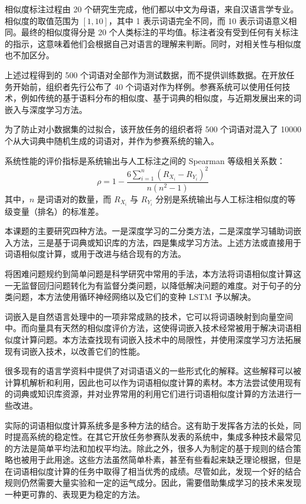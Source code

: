 相似度标注过程由 20 个研究生完成，他们都以中文为母语，来自汉语言学专业。相似度的取值范围为 $[1, 10]$，其中 1 表示词语完全不同，而 10 表示词语意义相同。最终的相似度得分是 20 个人类标注的平均值。标注者没有受到任何有关标注的指示，这意味着他们会根据自己对语言的理解来判断。同时，对相关性与相似度也不加区分。

上述过程得到的 500 个词语对全部作为测试数据，而不提供训练数据。在开放任务开始前，组织者先行公布了 40 个词语对作为样例。参赛系统可以使用任何技术，例如传统的基于语料分布的相似度、基于词典的相似度，与近期发展出来的词嵌入与深度学习方法。

为了防止对小数据集的过拟合，该开放任务的组织者将 500 个词语对混入了 10000 个从大词典中随机生成的词语对，并作为参赛系统的输入。

系统性能的评价指标是系统输出与人工标注之间的 Spearman 等级相关系数：
\begin{equation}
\rho = 1 - \frac{6 \sum_{i = 1}^{n}(R_{X_i} - R_{Y_i})^2}{n(n^2 - 1)}
\end{equation}
其中，$n$ 是词语对的数量，而 $R_{X_i}$ 与 $R_{Y_i}$ 分别是系统输出与人工标注相似度的等级变量（排名）的标准差。


本课题的主要研究四种方法。一是深度学习的二分类方法，二是深度学习辅助词嵌入方法，三是基于词典或知识库的方法，四是集成学习方法。上述方法或直接用于词语相似度计算，或用于改进与结合现有的方法。

将困难问题规约到简单问题是科学研究中常用的手法，本方法将词语相似度计算这一无监督回归问题转化为有监督分类问题，以降低解决问题的难度。对于句子的分类问题，本方法使用循环神经网络以及它们的变种 LSTM 予以解决。

词嵌入是自然语言处理中的一项非常成熟的技术，它可以将词语映射到向量空间中。而向量具有天然的相似度评价方法，这使得词嵌入技术经常被用于解决词语相似度计算问题。本方法查找现有词嵌入技术中的局限性，并使用深度学习方法拓展现有词嵌入技术，以改善它们的性能。

很多现有的语言学资料中提供了对词语语义的一些形式化的解释。这些解释可以被计算机解析和利用，因此也可以作为词语相似度计算的素材。本方法尝试使用现有的词典或知识库资源，并对业界常用的利用它们进行词语相似度计算的方法进行一些改进。

实际的词语相似度计算系统多是多种方法的结合。这有助于发挥各方法的长处，同时提高系统的稳定性。在其它开放任务参赛队发表的系统中，集成多种技术最常见的方法是简单平均法和加权平均法。除此之外，很多人为制定的基于规则的结合策略也被用于此用途。这些方法虽然简单朴素，甚至有些看起来缺乏理论根据，但是在词语相似度计算的任务中取得了相当优秀的成绩。尽管如此，发现一个好的结合规则仍然需要大量实验和一定的运气成分。因此，需要借助集成学习的技术来发现一种更可靠的、表现更为稳定的方法。